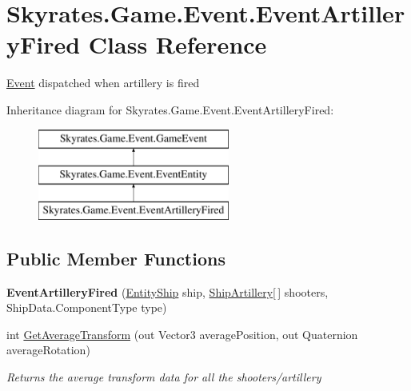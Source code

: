 \hypertarget{class_skyrates_1_1_game_1_1_event_1_1_event_artillery_fired}{\section{Skyrates.\-Game.\-Event.\-Event\-Artillery\-Fired Class Reference}
\label{class_skyrates_1_1_game_1_1_event_1_1_event_artillery_fired}
}


\hyperlink{namespace_skyrates_1_1_game_1_1_event}{Event} dispatched when artillery is fired  


Inheritance diagram for Skyrates.\-Game.\-Event.\-Event\-Artillery\-Fired\-:\begin{figure}[H]
\begin{center}
\leavevmode
\includegraphics[height=3.000000cm]{class_skyrates_1_1_game_1_1_event_1_1_event_artillery_fired}
\end{center}
\end{figure}
\subsection*{Public Member Functions}
\begin{DoxyCompactItemize}
\item 
\hypertarget{class_skyrates_1_1_game_1_1_event_1_1_event_artillery_fired_ab224084ec0efde3d4dbd0c9013892dd7}{{\bfseries Event\-Artillery\-Fired} (\hyperlink{class_skyrates_1_1_entity_1_1_entity_ship}{Entity\-Ship} ship, \hyperlink{class_skyrates_1_1_ship_1_1_ship_artillery}{Ship\-Artillery}\mbox{[}$\,$\mbox{]} shooters, Ship\-Data.\-Component\-Type type)}\label{class_skyrates_1_1_game_1_1_event_1_1_event_artillery_fired_ab224084ec0efde3d4dbd0c9013892dd7}

\item 
int \hyperlink{class_skyrates_1_1_game_1_1_event_1_1_event_artillery_fired_a64d832dab1c38cd3b6a35f502f639e10}{Get\-Average\-Transform} (out Vector3 average\-Position, out Quaternion average\-Rotation)
\begin{DoxyCompactList}\small\item\em Returns the average transform data for all the shooters/artillery \end{DoxyCompactList}\end{DoxyCompactItemize}
